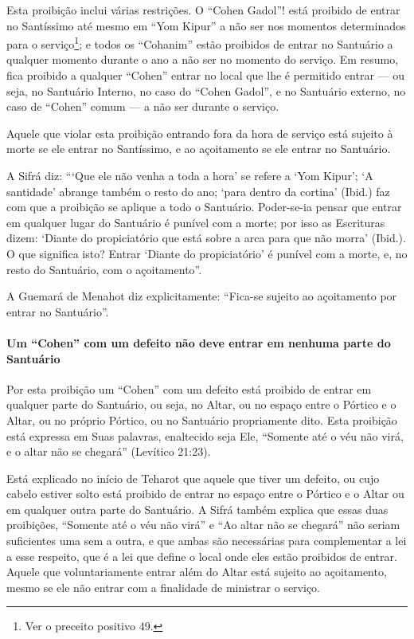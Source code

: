 Esta proibição inclui várias restrições. O ``Cohen Gadol''! está
proibido de entrar no Santíssimo até mesmo em ``Yom Kipur'' a não ser
nos momentos determinados para o serviço\footnote{Ver o preceito positivo 49.}; e todos
os ``Cohanim'' estão proibidos de entrar no Santuário a qualquer
momento durante o ano a não ser no momento do serviço. Em resumo, fica
proibido a qualquer ``Cohen'' entrar no local que lhe é permitido entrar
--- ou seja, no Santuário Interno, no caso do ``Cohen Gadol'', e no
Santuário externo, no caso de ``Cohen'' comum --- a não ser durante o
serviço.

Aquele que violar esta proibição entrando fora da hora de serviço está
sujeito à morte se ele entrar no Santíssimo, e ao açoitamento se ele
entrar no Santuário.

A Sifrá diz: ```Que ele não venha a toda a hora' se refere a `Yom
Kipur'; `A santidade' abrange também o resto do ano; `para dentro da
cortina' (Ibid.) faz com que a proibição se aplique a todo o Santuário.
Poder-se-ia pensar que entrar em qualquer lugar do Santuário é punível
com a morte; por isso as Escrituras dizem: `Diante do propiciatório que
está sobre a arca para que não morra' (Ibid.). O que significa isto?
Entrar `Diante do propiciatório' é punível com a morte, e, no resto do
Santuário, com o açoitamento''.

A Guemará de Menahot diz explicitamente: ``Fica-se sujeito ao
açoitamento por entrar no Santuário''.

\paragraph{Um ``Cohen'' com um defeito não deve entrar em nenhuma parte do
Santuário}

Por esta proibição um ``Cohen'' com um defeito está proibido de entrar
em qualquer parte do Santuário, ou seja, no Altar, ou no espaço entre o
Pórtico e o Altar, ou no próprio Pórtico, ou no Santuário propriamente
dito. Esta proibição está expressa em Suas palavras, enaltecido seja
Ele, ``Somente até o véu não virá, e o altar não se chegará'' (Levítico
21:23).

Está explicado no início de Teharot que aquele que tiver um defeito, ou
cujo cabelo estiver solto está proibido de entrar no espaço entre o
Pórtico e o Altar ou em qualquer outra parte do Santuário. A Sifrá
também explica que essas duas proibições, ``Somente até o véu não virá''
e ``Ao altar não se chegará'' não seriam suficientes uma sem a outra, e
que ambas são necessárias para complementar a lei a esse respeito, que é
a lei que define o local onde eles estão proibidos de entrar. Aquele que
voluntariamente entrar além do Altar está sujeito ao açoitamento, mesmo
se ele não entrar com a finalidade de ministrar o serviço.

